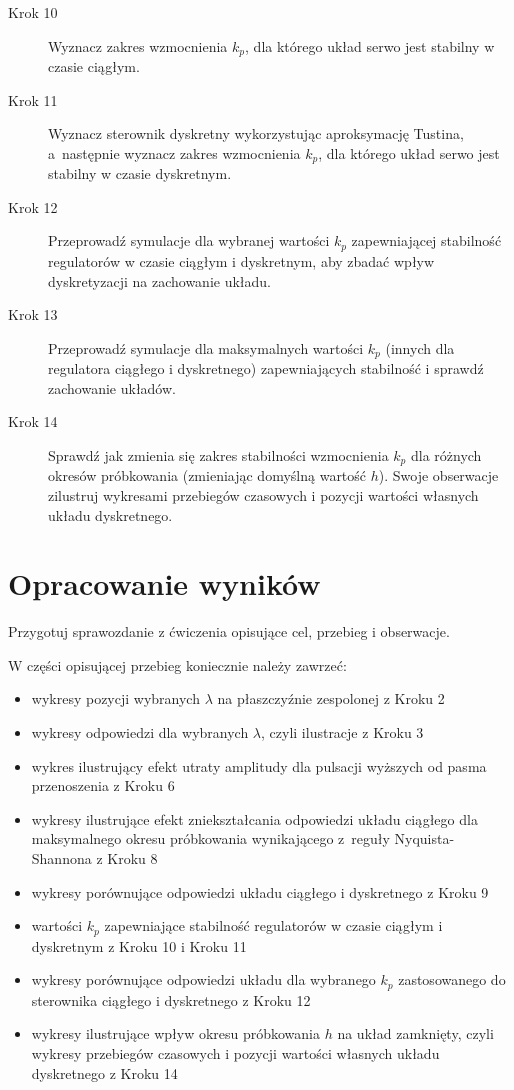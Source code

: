 \documentclass{sprawozdanie-agh}
\begin{document}
\begin{description}
\item[Krok 10] Wyznacz zakres wzmocnienia $k_p$, dla którego układ serwo jest stabilny w czasie ciągłym.
\item[Krok 11] Wyznacz sterownik dyskretny wykorzystując aproksymację Tustina, a~następnie wyznacz zakres wzmocnienia $k_p$, dla którego układ serwo jest stabilny w czasie dyskretnym.
\item[Krok 12] Przeprowadź symulacje dla wybranej wartości $k_p$ zapewniającej stabilność regulatorów w czasie ciągłym i dyskretnym, aby zbadać wpływ dyskretyzacji na zachowanie układu.
\item[Krok 13] Przeprowadź symulacje dla maksymalnych wartości $k_p$ (innych dla regulatora ciągłego i dyskretnego) zapewniających stabilność i sprawdź zachowanie układów.
\item[Krok 14] Sprawdź jak zmienia się zakres stabilności wzmocnienia $k_p$ dla różnych okresów próbkowania (zmieniając domyślną wartość $h$). Swoje obserwacje zilustruj wykresami przebiegów czasowych i pozycji wartości własnych układu dyskretnego.
\end{description}

\section{Opracowanie wyników}

Przygotuj sprawozdanie z ćwiczenia opisujące cel, przebieg i obserwacje.


W części opisującej przebieg koniecznie należy zawrzeć:
\begin{itemize}
    \item wykresy pozycji wybranych $\lambda$ na płaszczyźnie zespolonej z Kroku 2
    \item wykresy odpowiedzi dla wybranych $\lambda$, czyli ilustracje z Kroku 3
    \item wykres ilustrujący efekt utraty amplitudy dla pulsacji wyższych od pasma przenoszenia z Kroku 6
    \item wykresy ilustrujące efekt zniekształcania odpowiedzi układu ciągłego dla maksymalnego okresu próbkowania wynikającego z~reguły Nyquista-Shannona z Kroku 8
    \item wykresy porównujące odpowiedzi układu ciągłego i dyskretnego z Kroku 9
    \item wartości $k_p$ zapewniające stabilność regulatorów w czasie ciągłym i dyskretnym z Kroku 10 i Kroku 11
    \item wykresy porównujące odpowiedzi układu dla wybranego $k_p$ zastosowanego do sterownika ciągłego i dyskretnego z Kroku 12
    \item wykresy ilustrujące wpływ okresu próbkowania $h$ na układ zamknięty, czyli wykresy przebiegów czasowych i pozycji wartości własnych układu dyskretnego z Kroku 14
\end{itemize}
\end{document}
